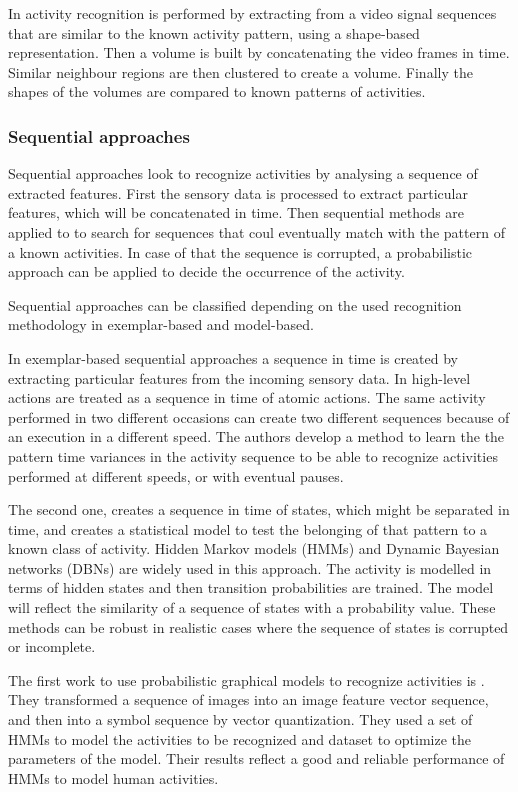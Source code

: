 \documentclass[a4paper, 12pt, openany, oneside]{book}
\begin{document}
In \citep{Ke2007_SpTmpShapeAR} activity recognition is performed by extracting from a video signal sequences that are similar to the known activity pattern, using a shape-based representation. 
Then a volume is built by concatenating the video frames in time. Similar neighbour regions are then clustered to create a volume. 
Finally the shapes of the volumes are compared to known patterns of activities.


\subsubsection{Sequential approaches} %
Sequential approaches look to recognize activities by analysing a sequence of extracted features. First the sensory data is processed to extract particular features, which will be concatenated in time. Then sequential methods are applied to to search for sequences that coul eventually match with the pattern of a known activities. In case of that the sequence is corrupted, a probabilistic approach can be applied to decide the occurrence of the activity.

Sequential approaches can be classified depending on the used recognition methodology in exemplar-based and model-based. 

In exemplar-based sequential approaches a sequence in time is created by extracting particular features from the incoming sensory data. In \citep{Veeraraghavan2006_FuncSpcAct} high-level actions are treated as a sequence in time of atomic actions. The same activity performed in two different occasions can create two different sequences because of an execution in a different speed. The authors develop a method to learn the the pattern time variances in the activity sequence to be able to recognize activities performed at different speeds, or with eventual pauses.

The second one, creates a sequence in time of states, which might be separated in time, and  creates a statistical model to test the belonging of that pattern to a known class of activity. Hidden Markov models (HMMs) and Dynamic Bayesian networks (DBNs) are widely used in this approach. The activity is modelled in terms of hidden states and then transition probabilities are trained. The model will reflect the similarity of a sequence of states with a probability value. These methods can be robust in realistic cases where the sequence of states is corrupted or incomplete.

The first work to use probabilistic graphical models to recognize activities is \citep{Yamato1992_RecHA_HMM}. They transformed a sequence of images into an image feature vector sequence, and then into a symbol sequence by vector quantization. They used a set of HMMs to model the activities to be recognized and dataset to optimize the parameters of the model. Their results reflect a good and reliable performance of HMMs to model human activities. 
\end{document}
